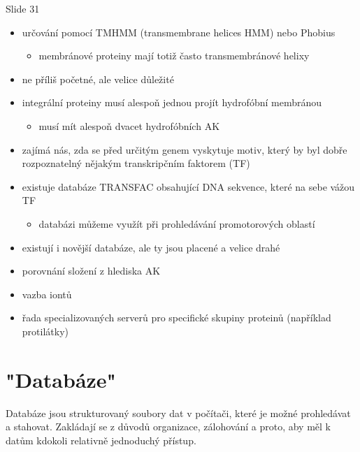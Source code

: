 \documentclass[DIV=8]{scrreprt}
\begin{document}
Slide 31
\begin{itemize}
    \item určování pomocí TMHMM (transmembrane helices HMM) nebo Phobius
\begin{itemize}
    \item membránové proteiny mají totiž často transmembránové helixy
\end{itemize}

    \item ne příliš početné, ale velice důležité
    \item integrální proteiny musí alespoň jednou projít hydrofóbní membránou
\begin{itemize}
    \item musí mít alespoň dvacet hydrofóbních AK
\end{itemize}

\end{itemize}


\begin{itemize}
    \item zajímá nás, zda se před určitým genem vyskytuje motiv, který by byl dobře rozpoznatelný nějakým transkripčním faktorem (TF)
    \item existuje databáze TRANSFAC obsahující DNA sekvence, které na sebe vážou TF
\begin{itemize}
    \item databázi můžeme využít při prohledávání promotorových oblastí
\end{itemize}

    \item existují i novější databáze, ale ty jsou placené a velice drahé
\end{itemize}


\begin{itemize}
    \item porovnání složení z hlediska AK
    \item vazba iontů
    \item řada specializovaných serverů pro specifické skupiny proteinů (například protilátky)
\end{itemize}


\chapter{"Databáze"}

Databáze jsou strukturovaný soubory dat v počítači, které je možné prohledávat a stahovat. Zakládají se z důvodů organizace, zálohování a proto, aby měl k datům kdokoli relativně jednoduchý přístup.
\end{document}

